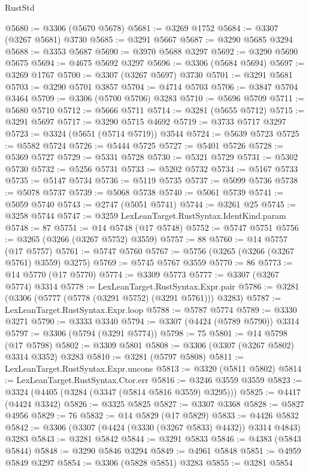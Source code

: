 \begin{lexlean}{RustStd}
\begin{coremodule}
@5680 := @3306 (@5670 @5678)
@5681 := @3269 @1752
@5684 := @3307 (@3267 @5681) @3730
@5685 := @3291 @5667
@5687 := @3290 @5685 @3294
@5688 := @3353 @5687
@5690 := @3970 @5688 @3297
@5692 := @3290 @5690 @5675
@5694 := @4675 @5692 @3297
@5696 := @3306 (@5684 @5694)
@5697 := @3269 @1767
@5700 := @3307 (@3267 @5697) @3730
@5701 := @3291 @5681
@5703 := @3290 @5701 @3857
@5704 := @4714 @5703
@5706 := @3847 @5704 @3464
@5709 := @3306 (@5700 @5706) @3283
@5710 := @5696 @5709
@5711 := @5680 @5710
@5712 := @5666 @5711
@5714 := @3281 (@5655 @5712)
@5715 := @3291 @5697
@5717 := @3290 @5715 @4692
@5719 := @3733 @5717 @3297
@5723 := @3324 (@5651 (@5714 @5719)) @3544
@5724 := @5639 @5723
@5725 := @5582 @5724
@5726 := @5444 @5725
@5727 := @5401 @5726
@5728 := @5369 @5727
@5729 := @5331 @5728
@5730 := @5321 @5729
@5731 := @5302 @5730
@5732 := @5256 @5731
@5733 := @5202 @5732
@5734 := @5167 @5733
@5735 := @5147 @5734
@5736 := @5119 @5735
@5737 := @5099 @5736
@5738 := @5078 @5737
@5739 := @5068 @5738
@5740 := @5061 @5739
@5741 := @5059 @5740
@5743 := @2747 (@5051 @5741)
@5744 := @3261 @25
@5745 := @3258 @5744
@5747 := @3259 LexLeanTarget.RustSyntax.IdentKind.param
@5748 := 87
@5751 := @14 @5748 (@17 @5748)
@5752 := @5747 @5751
@5756 := @3265 (@3266 (@3267 @5752) @3559)
@5757 := 88
@5760 := @14 @5757 (@17 @5757)
@5761 := @5747 @5760
@5767 := @5756 (@3265 (@3266 (@3267 @5761) @3559) @3275)
@5769 := @5745 @5767 @3559
@5770 := 86
@5773 := @14 @5770 (@17 @5770)
@5774 := @3309 @5773
@5777 := @3307 (@3267 @5774) @3314
@5778 := LexLeanTarget.RustSyntax.Expr.pair
@5786 := @3281 (@3306 (@5777 (@5778 (@3291 @5752) (@3291 @5761))) @3283)
@5787 := LexLeanTarget.RustSyntax.Expr.loop
@5788 := @5787 @5774
@5789 := @3330 @3271
@5790 := @3333 @3340
@5794 := @3307 (@4424 (@5789 @5790)) @3314
@5797 := @3306 (@5794 (@3291 @5774))
@5798 := 75
@5801 := @14 @5798 (@17 @5798)
@5802 := @3309 @5801
@5808 := @3306 (@3307 (@3267 @5802) @3314 @3352) @3283
@5810 := @3281 (@5797 @5808)
@5811 := LexLeanTarget.RustSyntax.Expr.uncons
@5813 := @3320 (@5811 @5802)
@5814 := LexLeanTarget.RustSyntax.Ctor.err
@5816 := @3246 @3559 @3559
@5823 := @3324 (@4405 (@3284 (@3347 (@5814 @5816 @3559) @3295)))
@5825 := @4417 (@4424 @3342)
@5826 := @3325 @5825
@5827 := @3307 @3368
@5828 := @5827 @4956
@5829 := 76
@5832 := @14 @5829 (@17 @5829)
@5833 := @4426 @5832
@5842 := @3306 (@3307 (@4424 (@3330 (@3267 @5833) @4432)) @3314 @4843) @3283
@5843 := @3281 @5842
@5844 := @3291 @5833
@5846 := @4383 (@5843 @5844)
@5848 := @3290 @5846 @3294
@5849 := @4961 @5848
@5851 := @4959 @5849 @3297
@5854 := @3306 (@5828 @5851) @3283
@5855 := @3281 @5854

\end{coremodule}
\end{lexlean}
